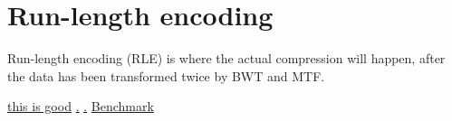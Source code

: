 \documentclass[a4paper, 11pt]{article}
\numberwithin{equation}{section}
\theoremstyle{plain}
\theoremstyle{definition}
\begin{document}
\section{Run-length encoding}
Run-length encoding (RLE) is where the actual compression will happen, after the data has been transformed twice by 
BWT and MTF.

\href{https://sites.google.com/site/datacompressionguide/}{this is good}
\href{https://en.wikipedia.org/wiki/PAQ}{.}
\href{https://tarsa.github.io/lossless-benchmark/}{.}
\href{https://www.mattmahoney.net/dc/text.html}{Benchmark}





\end{document}
